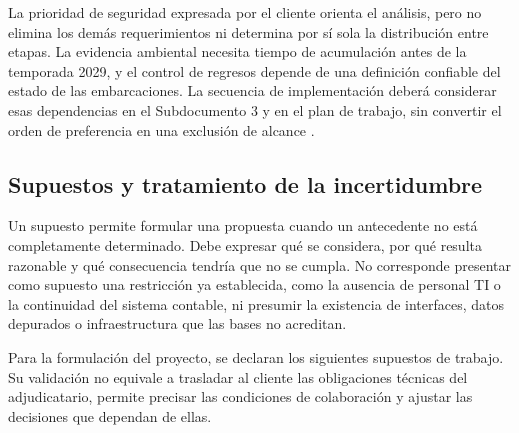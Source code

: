 La prioridad de seguridad expresada por el cliente orienta el análisis, pero no elimina los demás requerimientos ni determina por sí sola la distribución entre etapas. La evidencia ambiental necesita tiempo de acumulación antes de la temporada 2029, y el control de regresos depende de una definición confiable del estado de las embarcaciones. La secuencia de implementación deberá considerar esas dependencias en el Subdocumento 3 y en el plan de trabajo, sin convertir el orden de preferencia en una exclusión de alcance \parencite[cap.~13, pp.~28-29]{pucv-caso07-2026}.

\subsection{Supuestos y tratamiento de la incertidumbre} %
Un supuesto permite formular una propuesta cuando un antecedente no está completamente determinado. Debe expresar qué se considera, por qué resulta razonable y qué consecuencia tendría que no se cumpla. No corresponde presentar como supuesto una restricción ya establecida, como la ausencia de personal TI o la continuidad del sistema contable, ni presumir la existencia de interfaces, datos depurados o infraestructura que las bases no acreditan.

Para la formulación del proyecto, se declaran los siguientes supuestos de trabajo. Su validación no equivale a trasladar al cliente las obligaciones técnicas del adjudicatario, permite precisar las condiciones de colaboración y ajustar las decisiones que dependan de ellas.

